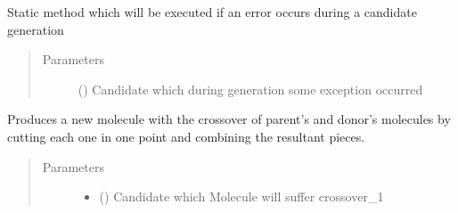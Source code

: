 \documentclass[letterpaper,10pt,english]{sphinxmanual}
\begin{document}
\begin{fulllineitems}
\begin{fulllineitems}
\label{\detokenize{MolOpt:MolOpt.MolOpt.catch}}
\sphinxAtStartPar
Static method which will be executed if an error occurs during a candidate generation
\begin{quote}\begin{description}
\item[{Parameters}] \leavevmode
\sphinxAtStartPar
{} ({\hyperref[\detokenize{genetic:genetic.Chromosome}]{}}) \textendash{} Candidate which during generation some exception occurred

\end{description}\end{quote}

\end{fulllineitems}


\begin{fulllineitems}
\label{\detokenize{MolOpt:MolOpt.MolOpt.crossover_1}}
\sphinxAtStartPar
Produces a new molecule with the crossover of parent’s and donor’s molecules by cutting each one in one point
and combining the resultant pieces.
\begin{quote}\begin{description}
\item[{Parameters}] \leavevmode\begin{itemize}
\item {} 
\sphinxAtStartPar
{} ({\hyperref[\detokenize{genetic:genetic.Chromosome}]{}}) \textendash{} Candidate which Molecule will suffer crossover\_1


\end{itemize}
\end{description}
\end{quote}
\end{fulllineitems}
\end{fulllineitems}
\end{document}
